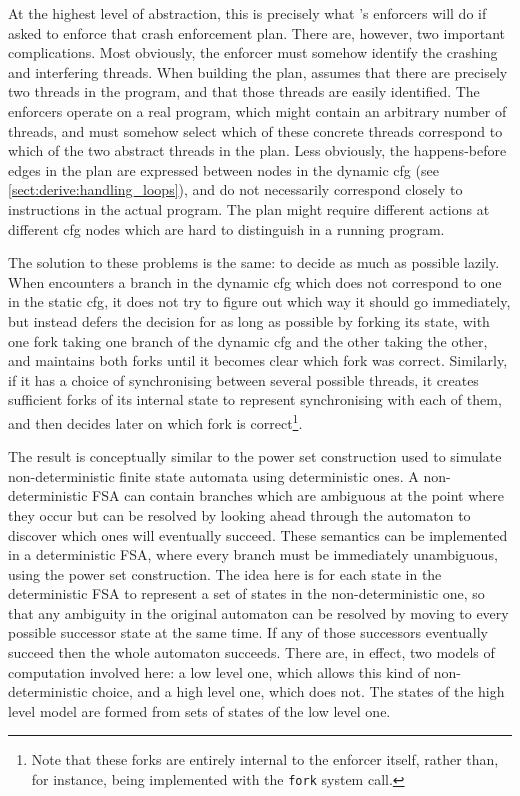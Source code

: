 At the highest level of abstraction, this is precisely what
{\implementation}'s enforcers will do if asked to enforce that crash
enforcement plan.  There are, however, two important complications.
Most obviously, the enforcer must somehow identify the crashing and
interfering threads.  When building the plan, {\technique} assumes
that there are precisely two threads in the program, and that those
threads are easily identified.  The enforcers operate on a real
program, which might contain an arbitrary number of threads, and must
somehow select which of these concrete threads correspond to which of
the two abstract threads in the plan.  Less obviously, the
happens-before edges in the plan are expressed between nodes in the
dynamic \gls{cfg} (see \autoref{sect:derive:handling_loops}), and do
not necessarily correspond closely to instructions in the actual
program.  The plan might require different actions at different
\gls{cfg} nodes which are hard to distinguish in a running program.

The solution to these problems is the same: to decide as much as
possible lazily.  When {\implementation} encounters a branch in the
dynamic \gls{cfg} which does not correspond to one in the static
\gls{cfg}, it does not try to figure out which way it should go
immediately, but instead defers the decision for as long as possible
by forking its state, with one fork taking one branch of the dynamic
\gls{cfg} and the other taking the other, and maintains both forks
until it becomes clear which fork was correct.  Similarly, if it has a
choice of synchronising between several possible threads, it creates
sufficient forks of its internal state to represent synchronising with
each of them, and then decides later on which fork is
correct\footnote{Note that these forks are entirely internal to the
  enforcer itself, rather than, for instance, being implemented with
  the \texttt{fork} system call.}.

The result is conceptually similar to the power set construction used
to simulate non-deterministic finite state automata using
deterministic ones\needCite{}.  A non-deterministic FSA can contain
branches which are ambiguous at the point where they occur but can be
resolved by looking ahead through the automaton to discover which ones
will eventually succeed.  These semantics can be implemented in a
deterministic FSA, where every branch must be immediately unambiguous,
using the power set construction.  The idea here is for each state in
the deterministic FSA to represent a set of states in the
non-deterministic one, so that any ambiguity in the original automaton
can be resolved by moving to every possible successor state at the
same time.  If any of those successors eventually succeed then the
whole automaton succeeds.  There are, in effect, two models of
computation involved here: a low level one, which allows this kind of
non-deterministic choice, and a high level one, which does not.  The
states of the high level model are formed from sets of states of the
low level one.

